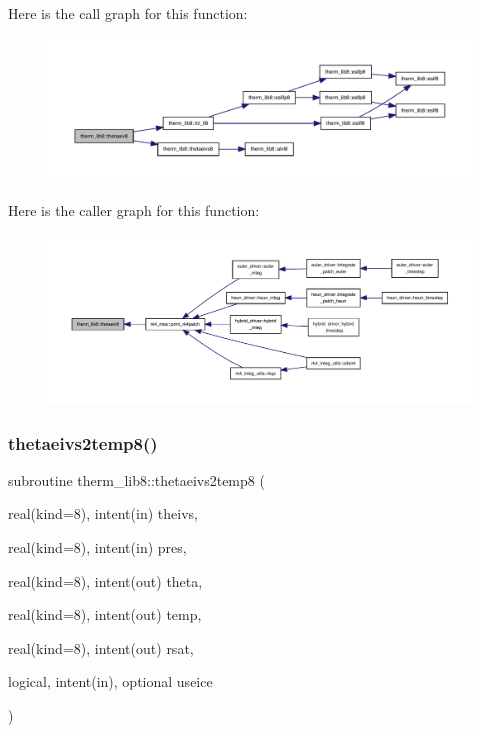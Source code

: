 Here is the call graph for this function\+:
\nopagebreak
\begin{figure}[H]
\begin{center}
\leavevmode
\includegraphics[width=350pt]{namespacetherm__lib8_aca0eeff24415eab272c13efcba42ebd5_cgraph}
\end{center}
\end{figure}
Here is the caller graph for this function\+:
\nopagebreak
\begin{figure}[H]
\begin{center}
\leavevmode
\includegraphics[width=350pt]{namespacetherm__lib8_aca0eeff24415eab272c13efcba42ebd5_icgraph}
\end{center}
\end{figure}
\mbox{\label{namespacetherm__lib8_a3a5271057d229a35bd188bd8cff5571b}} 
\subsubsection{\texorpdfstring{thetaeivs2temp8()}{thetaeivs2temp8()}}
{\footnotesize\ttfamily subroutine therm\+\_\+lib8\+::thetaeivs2temp8 (\begin{DoxyParamCaption}\item[{real(kind=8), intent(in)}]{theivs,  }\item[{real(kind=8), intent(in)}]{pres,  }\item[{real(kind=8), intent(out)}]{theta,  }\item[{real(kind=8), intent(out)}]{temp,  }\item[{real(kind=8), intent(out)}]{rsat,  }\item[{logical, intent(in), optional}]{useice }\end{DoxyParamCaption})}

